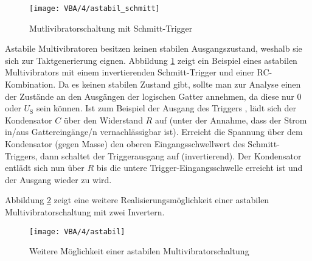 \begin{figure}[h]
  \begin{center}
    \texttt{[image: VBA/4/astabil\_schmitt]}
  \end{center}
  \caption{Mutlivibratorschaltung mit Schmitt-Trigger}
  \label{fig:astable1}
\end{figure}

Astabile Multivibratoren besitzen keinen stabilen Ausgangszustand, weshalb sie
sich zur Taktgenerierung eignen. Abbildung \ref{fig:astable1} zeigt ein
Beispiel eines astabilen Multivibrators mit einem invertierenden Schmitt-Trigger
und einer RC-Kombination. Da es keinen stabilen Zustand gibt, sollte man zur Analyse einen
der Zustände an den Ausgängen der logischen Gatter annehmen, da diese nur 0 oder
$U_{\mathrm{S}}$ sein können. Ist zum Beispiel der Ausgang des Triggers
\HIGH, lädt sich der Kondensator $C$ über den Widerstand $R$ auf (unter der
Annahme, dass der Strom in/aus Gattereingänge/n vernachlässigbar ist). Erreicht
die Spannung über dem Kondensator (gegen Masse) den oberen Eingangsschwellwert
des Schmitt-Triggers, dann schaltet der Triggerausgang auf \LOW (invertierend).
Der Kondensator entlädt sich nun über $R$ bis die untere
Trigger-Eingangsschwelle erreicht ist und der Ausgang wieder zu \HIGH wird.

Abbildung \ref{fig:astable2} zeigt eine weitere Realisierungsmöglichkeit einer
astabilen Multivibratorschaltung mit zwei Invertern.

\begin{figure}[h]
  \begin{center}
    \texttt{[image: VBA/4/astabil]}
  \end{center}
  \caption{Weitere Möglichkeit einer astabilen Multivibratorschaltung}
  \label{fig:astable2}
\end{figure}

